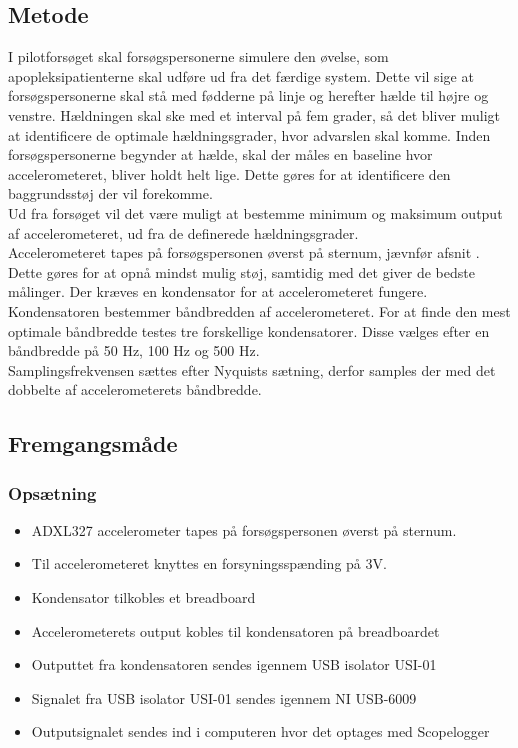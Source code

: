 \subsection{Metode}
I pilotforsøget skal forsøgspersonerne simulere den øvelse, som apopleksipatienterne skal udføre ud fra det færdige system. Dette vil sige at forsøgspersonerne skal stå med fødderne på linje og herefter hælde til højre og venstre. Hældningen skal ske med et interval på fem grader, så det bliver muligt at identificere de optimale hældningsgrader, hvor advarslen skal komme. Inden forsøgspersonerne begynder at hælde, skal der måles en baseline hvor accelerometeret, bliver holdt helt lige. Dette gøres for at identificere den baggrundsstøj der vil forekomme. \\
Ud fra forsøget vil det være muligt at bestemme minimum og maksimum output af accelerometeret, ud fra de definerede hældningsgrader. \\
Accelerometeret tapes på forsøgspersonen øverst på sternum, jævnfør afsnit . Dette gøres for at opnå mindst mulig støj, samtidig med det giver de bedste målinger. Der kræves en kondensator for at accelerometeret fungere. Kondensatoren bestemmer båndbredden af accelerometeret. For at finde den mest optimale båndbredde testes tre forskellige kondensatorer. Disse vælges efter en båndbredde på 50 Hz, 100 Hz og 500 Hz. \\
Samplingsfrekvensen sættes efter Nyquists sætning, derfor samples der med det dobbelte af accelerometerets båndbredde.


\subsection{Fremgangsmåde}
\subsubsection{Opsætning}
\begin{itemize}
\item ADXL327 accelerometer tapes på forsøgspersonen øverst på sternum.
\item Til accelerometeret knyttes en forsyningsspænding på 3V. 
\item Kondensator tilkobles et breadboard
\item Accelerometerets output kobles til kondensatoren på breadboardet
\item Outputtet fra kondensatoren sendes igennem USB isolator USI-01 
\item Signalet fra USB isolator USI-01 sendes igennem NI USB-6009
\item Outputsignalet sendes ind i computeren hvor det optages med Scopelogger
\end{itemize}

